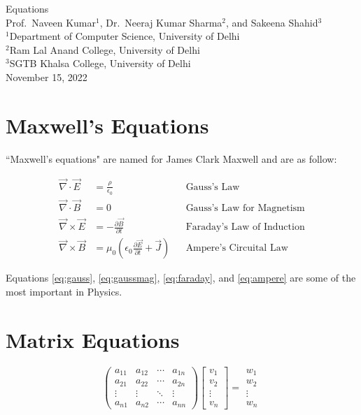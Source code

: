 \documentclass[10pt,a4paper]{article}
\begin{document}
\begin{center}
  {\Large Equations}\\[0.8em]
  Prof.\ Naveen Kumar$^1$, Dr.\ Neeraj Kumar Sharma$^2$, and Sakeena Shahid$^3$\\[0.5em]
  {\small
    $^1$Department of Computer Science, University of Delhi\\
    $^2$Ram Lal Anand College, University of Delhi\\
    $^3$SGTB Khalsa College, University of Delhi
  }\\[0.5em]
    \vspace{1em}
  November 15, 2022
\end{center}


\section{Maxwell's Equations}
``Maxwell's equations" are named for James Clark Maxwell and are as follow:

\begin{align}
  \vec{\nabla} \cdot \vec{E}  &= \frac{\rho}{\epsilon_0}
      & &\text{Gauss's Law} \label{eq:gauss} \\
  \vec{\nabla} \cdot \vec{B}  &= 0
      & &\text{Gauss's Law for Magnetism} \label{eq:gaussmag} \\
  \vec{\nabla} \times \vec{E} &= -\frac{\partial\vec{B}}{\partial t}
      & &\text{Faraday's Law of Induction} \label{eq:faraday} \\
  \vec{\nabla} \times \vec{B} &= \mu_0\!\left(\epsilon_0
      \frac{\partial\vec{E}}{\partial t}+\vec{J}\right)
      & &\text{Ampere's Circuital Law} \label{eq:ampere}
\end{align}

Equations \ref{eq:gauss}, \ref{eq:gaussmag}, \ref{eq:faraday}, and \ref{eq:ampere} are some of the most important in Physics.

\section{Matrix Equations}
$$
  \begin{pmatrix}
    a_{11} & a_{12} & \cdots & a_{1n} \\
    a_{21} & a_{22} & \cdots & a_{2n} \\
    \vdots & \vdots & \ddots & \vdots \\
    a_{n1} & a_{n2} & \cdots & a_{nn}
  \end{pmatrix}
  \begin{bmatrix} v_1 \\ v_2 \\ \vdots \\ v_n \end{bmatrix}
  =
  \begin{matrix} w_1 \\ w_2 \\ \vdots \\ w_n \end{matrix}
$$
\end{document}
